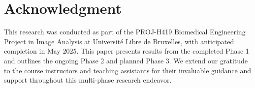 \section*{Acknowledgment}
This research was conducted as part of the PROJ-H419 Biomedical Engineering Project in Image Analysis at Université Libre de Bruxelles, with anticipated completion in May 2025. This paper presents results from the completed Phase 1 and outlines the ongoing Phase 2 and planned Phase 3. We extend our gratitude to the course instructors and teaching assistants for their invaluable guidance and support throughout this multi-phase research endeavor.

